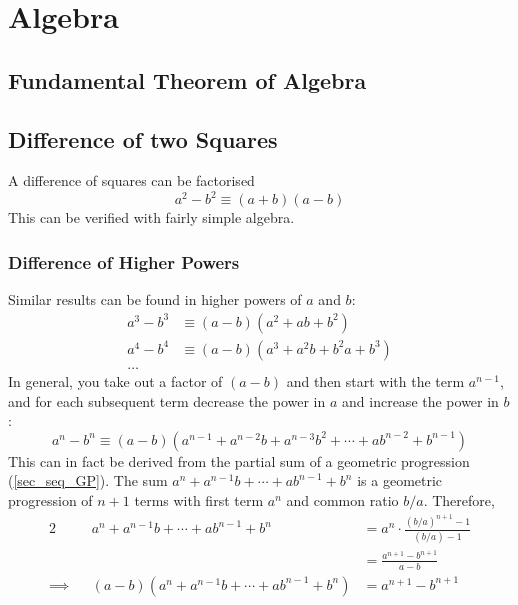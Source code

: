 \section{Algebra} \label{sec_algebra}

\subsection{Fundamental Theorem of Algebra}

\subsection{Difference of two Squares}

A difference of squares can be factorised
\begin{equation*}
 a^2 - b^2 \equiv (a + b)(a - b)
\end{equation*}
This can be verified with fairly simple
algebra.

\subsubsection{Difference of Higher Powers}

Similar results can be found in higher powers of \(a\) and \(b\):
\begin{align*}
 a^3 - b^3 &\equiv (a - b)(a^2 + ab + b^2) \\
 a^4 - b^4 &\equiv (a - b)(a^3 + a^2b + b^2a + b^3) \\
 \dots
\end{align*}
In general, you take out a factor of \((a - b)\) and then start with the
term \(a^{n - 1}\), and for each subsequent term decrease the power in \(a\)
and increase the power in \(b\):
\begin{equation*}
 a^n - b^n \equiv (a - b)(a^{n - 1} + a^{n - 2}b + a^{n - 3}b^2 + \dotsb +
                         ab^{n - 2} + b^{n - 1})
\end{equation*}
This can in fact be derived from the partial sum of a geometric progression
(\ref{sec_seq_GP}). The sum \(a^n + a^{n - 1}b + \dotsb + ab^{n - 1} + b^n\) is
a geometric progression of \(n + 1\) terms with first term \(a^n\) and
common ratio \(b/a\). Therefore,
\begin{alignat*}2
 &&a^n + a^{n - 1}b + \dotsb + ab^{n - 1} + b^n &=
         a^n \cdot \frac{(b / a)^{n + 1} - 1}{(b / a) - 1} \\
 &&    &= \frac{a^{n + 1} - b^{n + 1}}{a - b} \\
 \implies{}&& (a - b)(a^n + a^{n - 1}b + \dotsb + ab^{n - 1} + b^n) &=
         a^{n + 1} - b^{n + 1}
\end{alignat*}

